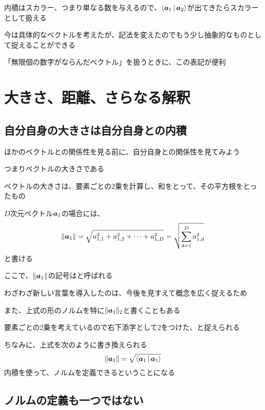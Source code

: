 \documentclass[../book_half_step_linear]{subfiles}
\begin{document}
内積はスカラー、つまり単なる数を与えるので、$\Braket{\vb*{a}_1|\vb*{a}_2}$が出てきたらスカラーとして扱える

\br

今は具体的なベクトルを考えたが、記法を変えたのでもう少し抽象的なものとして捉えることができる

「無限個の数字がならんだベクトル」を扱うときに、この表記が便利

\section{大きさ、距離、さらなる解釈}

\subsection{自分自身の大きさは自分自身との内積}

ほかのベクトルとの関係性を見る前に、自分自身との関係性を見てみよう

つまりベクトルの大きさである

\br

ベクトルの大きさは、要素ごとの2乗を計算し、和をとって、その平方根をとったもの

$D$次元ベクトル$\vb*{a}_1$の場合には、
\begin{equation*}
  \lVert \vb*{a}_1 \rVert = \sqrt{a_{1,1}^2 + a_{1,2}^2 + \cdots + a_{1,D}^2} = \sqrt{\sum_{d=1}^{D} a_{1,d}^2}
\end{equation*}
と書ける

\br

ここで、$\lVert \vb*{a}_1 \rVert$の記号はと呼ばれる

わざわざ新しい言葉を導入したのは、今後を見すえて概念を広く捉えるため

\br

また、上式の形のノルムを特に$\lVert \vb*{a}_1 \rVert_2$と書くこともある

要素ごとの2乗を考えているので右下添字として$2$をつけた、と捉えられる

\br

ちなみに、上式を次のように書き換えられる
\begin{equation*}
  \lVert \vb*{a}_1 \rVert = \sqrt{\Braket{\vb*{a}_1|\vb*{a}_1}}
\end{equation*}
内積を使って、ノルムを定義できるということになる

\sectionline
\subsection{ノルムの定義も一つではない}
\end{document}
